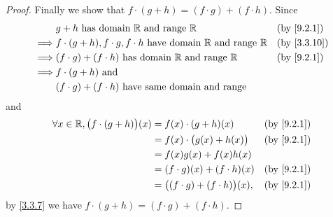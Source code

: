 \begin{proof}
  Finally we show that \(f \cdot (g + h) = (f \cdot g) + (f \cdot h)\).
  Since
  \begin{align*}
             & g + h \text{ has domain } \R \text{ and range } \R                                   &  & \by{9.2.1}                \\
    \implies & f \cdot (g + h), f \cdot g, f \cdot h  \text{ have domain } \R \text{ and range } \R &  & \text{(by \cref{3.3.10})} \\
    \implies & (f \cdot g) + (f \cdot h)  \text{ has domain } \R \text{ and range } \R              &  & \by{9.2.1}                \\
    \implies & f \cdot (g + h) \text{ and }                                                                                        \\
             & (f \cdot g) + (f \cdot h) \text{ have same domain and range}
  \end{align*}
  and
  \begin{align*}
    \forall x \in \R, \big(f \cdot (g + h)\big)(x) & = f(x) \cdot (g + h)(x)                   &  & \by{9.2.1} \\
                                                   & = f(x) \cdot \big(g(x) + h(x)\big)        &  & \by{9.2.1} \\
                                                   & = f(x)g(x) + f(x)h(x)                                     \\
                                                   & = (f \cdot g)(x) + (f \cdot h)(x)         &  & \by{9.2.1} \\
                                                   & = \big((f \cdot g) + (f \cdot h)\big)(x), &  & \by{9.2.1}
  \end{align*}
  by \cref{3.3.7} we have \(f \cdot (g + h) = (f \cdot g) + (f \cdot h)\).
\end{proof}